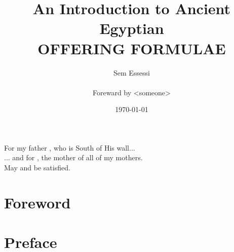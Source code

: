 \documentclass[a4paper,pagesize,8pt,pointlessnumbers,normalheadings]{book}
\title{
	\Large An Introduction to Ancient Egyptian\\
	\Huge \textbf{OFFERING FORMULAE}}
\author{Sem Essessi\\\\Foreward by <someone>}
\date{\today}
\begin{document}
\maketitle

\clearpage
\vspace*{\fill}
\clearpage


\clearpage
\vspace*{\fill}
\clearpage

\vspace*{\fill}
\begin{center}
For my father , who is South of His wall...\\
\vspace{7.5mm}
... and for , the mother of all of my mothers.\\
\vspace{15mm}
May  and  be satisfied.\\
\end{center}
\vspace*{\fill}

\tableofcontents

\markboth{}{}

\newlength\q
\setlength{}

\chapter*{Foreword}

\markboth{}{}

\chapter*{Preface}

\markboth{}{}
\end{document}
